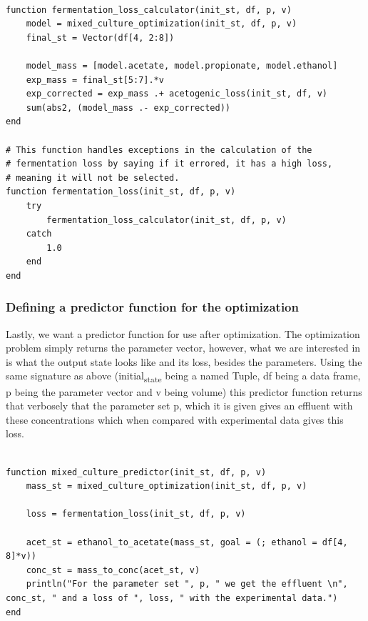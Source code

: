 \documentclass[11pt]{article}
\begin{document}
\begin{verbatim}

function fermentation_loss_calculator(init_st, df, p, v)
    model = mixed_culture_optimization(init_st, df, p, v)
    final_st = Vector(df[4, 2:8])

    model_mass = [model.acetate, model.propionate, model.ethanol]
    exp_mass = final_st[5:7].*v
    exp_corrected = exp_mass .+ acetogenic_loss(init_st, df, v)
    sum(abs2, (model_mass .- exp_corrected))
end

# This function handles exceptions in the calculation of the
# fermentation loss by saying if it errored, it has a high loss,
# meaning it will not be selected.
function fermentation_loss(init_st, df, p, v)
    try
        fermentation_loss_calculator(init_st, df, p, v)
    catch
        1.0
    end
end

\end{verbatim}

\subsubsection{Defining a predictor function for the optimization}
\label{sec:orgf50c832}
Lastly, we want a predictor function for use after optimization. The optimization problem simply returns the parameter vector, however, what we are interested in is what the output state looks like and its loss, besides the parameters. Using the same signature as above (initial\textsubscript{state} being a named Tuple, df being a data frame, p being the parameter vector and v being volume) this predictor function returns that verbosely that the parameter set p, which it is given gives an effluent with these concentrations which when compared with experimental data gives this loss.

\begin{verbatim}

function mixed_culture_predictor(init_st, df, p, v)
    mass_st = mixed_culture_optimization(init_st, df, p, v)

    loss = fermentation_loss(init_st, df, p, v)

    acet_st = ethanol_to_acetate(mass_st, goal = (; ethanol = df[4, 8]*v))
    conc_st = mass_to_conc(acet_st, v)
    println("For the parameter set ", p, " we get the effluent \n", conc_st, " and a loss of ", loss, " with the experimental data.")
end

\end{verbatim}
\end{document}

